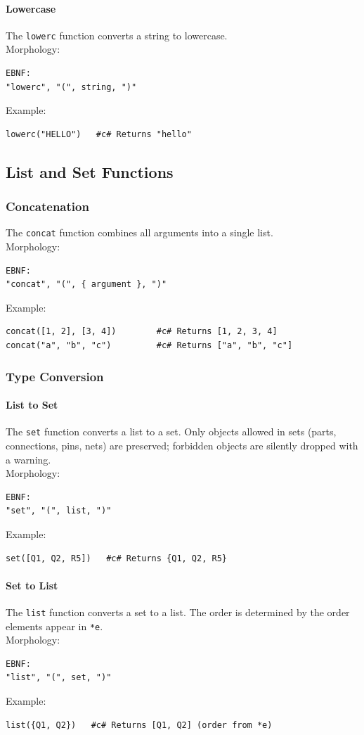 \documentclass{report}
\begin{document}
\paragraph{Lowercase}
The \texttt{lowerc} function converts a string to lowercase. \\
Morphology:
\begin{verbatim}
EBNF:
"lowerc", "(", string, ")"
\end{verbatim}
Example:
\begin{verbatim}
lowerc("HELLO")   #c# Returns "hello"
\end{verbatim}


\subsection{List and Set Functions}

\subsubsection{Concatenation}
The \texttt{concat} function combines all arguments into a single list. \\
Morphology:
\begin{verbatim}
EBNF:
"concat", "(", { argument }, ")"
\end{verbatim}
Example:
\begin{verbatim}
concat([1, 2], [3, 4])        #c# Returns [1, 2, 3, 4]
concat("a", "b", "c")         #c# Returns ["a", "b", "c"]
\end{verbatim}

\subsubsection{Type Conversion}
\paragraph{List to Set}
The \texttt{set} function converts a list to a set. Only objects allowed in sets (parts, connections, pins, nets) are preserved; forbidden objects are silently dropped with a warning. \\
Morphology:
\begin{verbatim}
EBNF:
"set", "(", list, ")"
\end{verbatim}
Example:
\begin{verbatim}
set([Q1, Q2, R5])   #c# Returns {Q1, Q2, R5}
\end{verbatim}

\paragraph{Set to List}
The \texttt{list} function converts a set to a list. The order is determined by the order elements appear in \texttt{*e}. \\
Morphology:
\begin{verbatim}
EBNF:
"list", "(", set, ")"
\end{verbatim}
Example:
\begin{verbatim}
list({Q1, Q2})   #c# Returns [Q1, Q2] (order from *e)
\end{verbatim}
\end{document}
